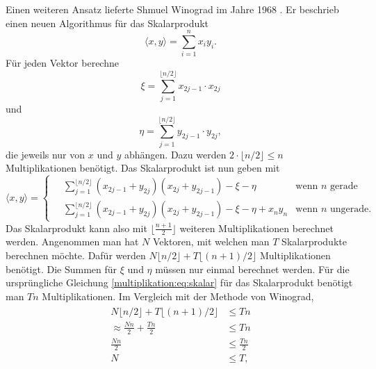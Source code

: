 Einen weiteren Ansatz lieferte Shmuel Winograd im Jahre 1968 \cite{multiplikation:winograd_1968}.
Er beschrieb einen neuen Algorithmus f\"ur das Skalarprodukt
\begin{equation} \label{multiplikation:eq:skalar}
	\langle x,y \rangle = \sum_{i=1}^{n}x_i y_i.
\end{equation}
F\"ur jeden Vektor berechne
\begin{equation}
	\xi = \sum_{j=1}^{ \lfloor n/2 \rfloor} x_{2j-1} \cdot x_{2j}
\end{equation}
und
\begin{equation}
	\eta = \sum_{j=1}^{ \lfloor n/2 \rfloor} y_{2j-1} \cdot y_{2j},
\end{equation}
die jeweils nur von $x$ und $y$ abhängen.
Dazu werden $2 \cdot  \lfloor n/2 \rfloor \leq n$ Multiplikationen benötigt.
Das Skalarprodukt ist nun geben mit
\begin{equation}
	\langle x,y \rangle =
	\begin{cases}
	 \displaystyle \quad \sum_{j=1}^{ \lfloor n/2 \rfloor} (x_{2j-1} + y_{2j})(x_{2j}+y_{2j-1})-\xi - \eta & \text{wenn  $n$ gerade}\\
	\displaystyle  \quad \sum_{j=1}^{ \lfloor n/2 \rfloor} (x_{2j-1} + y_{2j})(x_{2j}+y_{2j-1})-\xi - \eta + x_n y_n & \text{wenn  $n$ ungerade}.
	\end{cases}
\end{equation}
Das Skalarprodukt kann also mit $ \lfloor \frac{n+1}{2} \rfloor$ weiteren Multiplikationen berechnet werden.
Angenommen man hat $N$ Vektoren, mit welchen man $T$ Skalarprodukte berechnen m\"ochte.
Daf\"ur werden $N\lfloor n/2 \rfloor + T\lfloor (n+1)/2 \rfloor $ Multiplikationen ben\"otigt.
Die Summen f\"ur $\xi$ und $\eta$ m\"ussen nur einmal berechnet werden.
Für die ursprüngliche Gleichung \eqref{multiplikation:eq:skalar} für das Skalarprodukt benötigt man $Tn$ Multiplikationen.
Im Vergleich mit der Methode von Winograd,
	\begin{align}\label{multiplikation:eq:eff}
	\begin{split}
		N\lfloor n/2 \rfloor + T\lfloor (n+1)/2 \rfloor &\leq Tn \\
		\approx \frac{Nn}{2} + \frac{Tn}{2} &\leq Tn \\
		\frac{Nn}{2} &\leq \frac{Tn}{2} \\
		N &\leq T,
\end{split}
\end{align}
